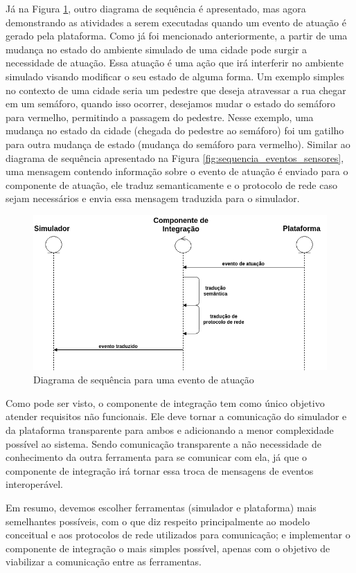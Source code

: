 Já na Figura \ref{fig:sequencia_eventos_atuacao}, outro diagrama de sequência é apresentado, mas agora demonstrando as atividades a serem executadas quando um evento de atuação é gerado pela plataforma.
Como já foi mencionado anteriormente, a partir de uma mudança no estado do ambiente simulado de uma cidade pode surgir a necessidade de atuação.
Essa atuação é uma ação que irá interferir no ambiente simulado visando modificar o seu estado de alguma forma.
Um exemplo simples no contexto de uma cidade seria um pedestre que deseja atravessar a rua chegar em um semáforo, quando isso ocorrer, desejamos mudar o estado do semáforo para vermelho, permitindo
a passagem do pedestre.
Nesse exemplo, uma mudança no estado da cidade (chegada do pedestre ao semáforo) foi um gatilho para outra mudança de estado (mudança do semáforo para vermelho). 
Similar ao diagrama de sequência apresentado na Figura \ref{fig:sequencia_eventos_sensores}, uma mensagem contendo informação sobre o evento de atuação é enviado para o componente de atuação,
ele traduz semanticamente e o protocolo de rede caso sejam necessários e envia essa mensagem traduzida para o simulador.

\begin{figure}[ht]
	\centering
	\includegraphics[width=\textwidth]{figuras/sequencia_eventos_atuacao.png}
	\caption{Diagrama de sequência para uma evento de atuação}
	\label{fig:sequencia_eventos_atuacao}
\end{figure}

Como pode ser visto, o componente de integração tem como único objetivo atender requisitos não funcionais.
Ele deve tornar a comunicação do simulador e da plataforma transparente para ambos e adicionando a menor complexidade possível ao sistema.
Sendo comunicação transparente a não necessidade de conhecimento da outra ferramenta para se comunicar com ela, já que o componente de integração irá tornar essa troca de mensagens de eventos interoperável.

Em resumo, devemos escolher ferramentas (simulador e plataforma) mais semelhantes possíveis, com o que diz respeito principalmente ao modelo conceitual e aos protocolos de
rede utilizados para comunicação; e implementar o componente de integração o mais simples possível, apenas com o objetivo de viabilizar a comunicação entre as ferramentas.

